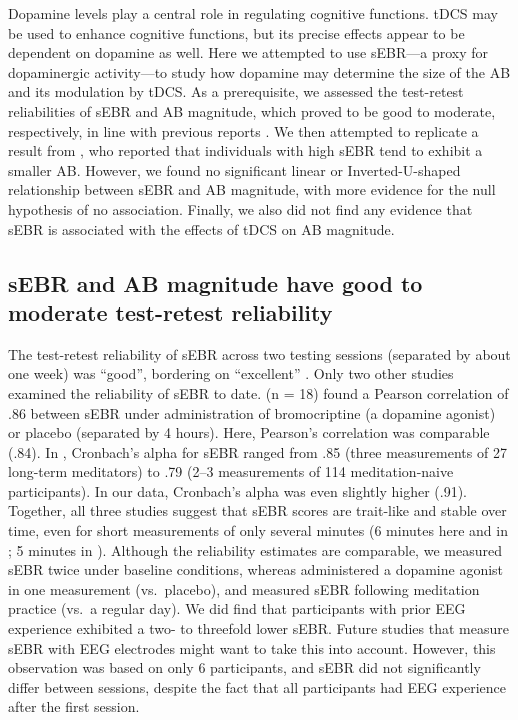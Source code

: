 \documentclass[11pt,]{memoir}
\begin{document}
Dopamine levels play a central role in regulating cognitive functions. tDCS may be used to enhance cognitive functions, but its precise effects appear to be dependent on dopamine as well. Here we attempted to use sEBR---a proxy for dopaminergic activity---to study how dopamine may determine the size of the AB and its modulation by tDCS. As a prerequisite, we assessed the test-retest reliabilities of sEBR and AB magnitude, which proved to be good to moderate, respectively, in line with previous reports \autocites{Kruis2016}{Dang2017}{Dale2013}. We then attempted to replicate a result from \textcite{Colzato2008}, who reported that individuals with high sEBR tend to exhibit a smaller AB. However, we found no significant linear or Inverted-U-shaped relationship between sEBR and AB magnitude, with more evidence for the null hypothesis of no association. Finally, we also did not find any evidence that sEBR is associated with the effects of tDCS on AB magnitude.

\hypertarget{sebr-and-ab-magnitude-have-good-to-moderate-test-retest-reliability}{%
\subsection{sEBR and AB magnitude have good to moderate test-retest reliability}\label{sebr-and-ab-magnitude-have-good-to-moderate-test-retest-reliability}}

The test-retest reliability of sEBR across two testing sessions (separated by about one week) was ``good'', bordering on ``excellent'' \autocite{Koo2016}. Only two other studies examined the reliability of sEBR to date. \textcite{Dang2017} (n = 18) found a Pearson correlation of .86 between sEBR under administration of bromocriptine (a dopamine agonist) or placebo (separated by 4 hours). Here, Pearson's correlation was comparable (.84). In \textcite{Kruis2016}, Cronbach's alpha for sEBR ranged from .85 (three measurements of 27 long-term meditators) to .79 (2--3 measurements of 114 meditation-naive participants). In our data, Cronbach's alpha was even slightly higher (.91). Together, all three studies suggest that sEBR scores are trait-like and stable over time, even for short measurements of only several minutes (6 minutes here and in \textcite{Kruis2016}; 5 minutes in \textcite{Dang2017}). Although the reliability estimates are comparable, we measured sEBR twice under baseline conditions, whereas \textcite{Dang2017} administered a dopamine agonist in one measurement (vs.~placebo), and \textcite{Kruis2016} measured sEBR following meditation practice (vs.~a regular day). We did find that participants with prior EEG experience exhibited a two- to threefold lower sEBR. Future studies that measure sEBR with EEG electrodes might want to take this into account. However, this observation was based on only 6 participants, and sEBR did not significantly differ between sessions, despite the fact that all participants had EEG experience after the first session.
\end{document}
